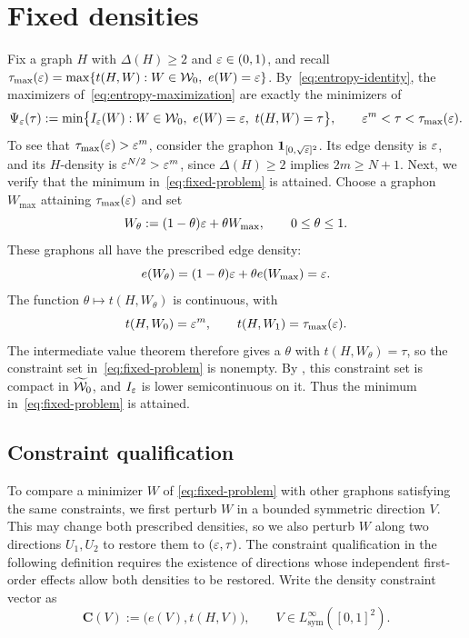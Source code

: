 \section{Fixed densities}\label{sec:fixed-densities}

Fix a graph $H$ with $\Delta(H)\ge2$ and $\varepsilon\in(0,1)$, and recall
$\tau_{\max}(\eps)=\max\{t(H,W):W\in\W_0,\ e(W)=\eps\}$.  By~\eqref{eq:entropy-identity},
the maximizers of~\eqref{eq:entropy-maximization} are exactly the minimizers of
\begin{equation}\label{eq:fixed-problem}
  \Psi_\eps(\tau):=\min\bigl\{I_\eps(W):W\in\W_0,\ e(W)=\eps,\ t(H,W)=\tau\bigr\},
  \qquad
  \eps^m<\tau<\tau_{\max}(\eps).
\end{equation}
To see that $\tau_{\max}(\varepsilon)>\varepsilon^m$, consider the graphon
$\mathbf 1_{[0,\sqrt{\varepsilon}]^2}$. Its edge density is $\varepsilon$, and its
$H$-density is $\varepsilon^{N/2}>\varepsilon^m$, since $\Delta(H)\ge2$ implies
$2m\ge N+1$.
Next, we verify that the minimum in~\eqref{eq:fixed-problem} is attained.
Choose a graphon $W_{\max}$ attaining $\tau_{\max}(\varepsilon)$ and set
\[
  W_\theta:=(1-\theta)\varepsilon+\theta W_{\max},\qquad 0\le\theta\le1.
\]
These graphons all have the prescribed edge density:
\[
  e(W_\theta)=(1-\theta)\varepsilon+\theta e(W_{\max})=\varepsilon.
\]
The function $\theta\mapsto t(H,W_\theta)$ is continuous, with
\[
  t(H,W_0)=\varepsilon^m,\qquad t(H,W_1)=\tau_{\max}(\varepsilon).
\]
The intermediate value theorem therefore gives a $\theta$ with
$t(H,W_\theta)=\tau$, so the constraint set in~\eqref{eq:fixed-problem}
is nonempty.
By , this constraint set is compact in
$\widetilde{\mathcal W}_0$, and $I_\varepsilon$ is lower semicontinuous on it.
Thus the minimum in~\eqref{eq:fixed-problem} is attained.

\subsection{Constraint qualification}\label{sec:constraint-qualification}

To compare a minimizer $W$ of \eqref{eq:fixed-problem}
with other graphons satisfying the same
constraints, we first perturb $W$ in a bounded symmetric direction $V$.
This may change both prescribed densities, so we also perturb $W$ along
two directions $U_1,U_2$ to restore them to $(\varepsilon,\tau)$. The constraint
qualification in the following definition
requires the existence of directions whose independent
first-order effects allow both densities to be restored.
Write the density constraint vector as
\[
  \mathbf C(V):=\bigl(e(V),t(H,V)\bigr),
  \qquad V\in L^\infty_{\mathrm{sym}}([0,1]^2).
\]

